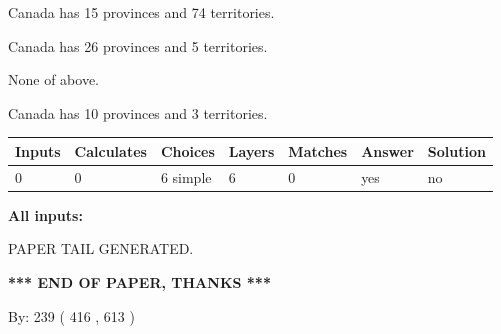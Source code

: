 \documentclass[12pt]{article}
\begin{document}
 
Canada has  15 provinces and  74 territories.
 
 
Canada has  26 provinces and  5 territories.
 
 
 None of above.
 
 
\noindent{}
 
 
Canada has 10  provinces and 3 territories.
 
 
\noindent{}
 
 
   
   
   
   
\noindent\begin{tabular}{|l|l|l|l|l|l|l|}
 \hline
Inputs & Calculates & Choices & Layers & Matches & Answer & Solution \\ \hline
 0  & 
 0  & 
 6
  simple  
  & 
 6  & 
 0  & 
  yes & 
  no 
  \\ \hline
 \end{tabular}
   
   
   
   
\noindent{}
   
   
   
   
\noindent\vspace{0.1in}\hspace{-0.08in} {\textbf{\Large{All inputs: }}}
   
   
   
   
   
   
 \vspace{0.2in}
 
   
   
\vspace{2.0in} PAPER TAIL GENERATED.
   
   
   
   
\vspace{1.0in} 
{\textbf{\large{ *** END OF PAPER, THANKS *** }}} 
   
   
\hspace{1.0in} By: 
 239 ( 416 ,  613 )
   
   
   
   
\newpage 
\setcounter{page}{ 
   524001 } 
   
   
   
\end{document}
